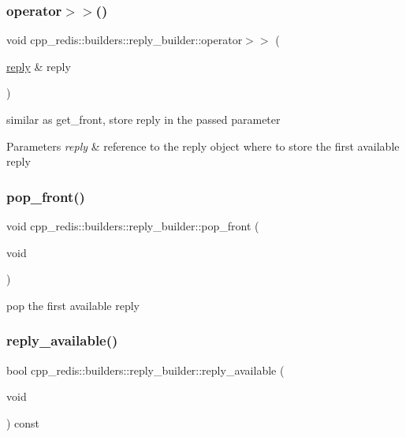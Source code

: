 \subsubsection{\texorpdfstring{operator$>$$>$()}{operator>>()}}
{\footnotesize\ttfamily void cpp\+\_\+redis\+::builders\+::reply\+\_\+builder\+::operator$>$$>$ (\begin{DoxyParamCaption}\item[{\mbox{\hyperlink{classcpp__redis_1_1reply}{reply}} \&}]{reply }\end{DoxyParamCaption})}

similar as get\+\_\+front, store reply in the passed parameter


\begin{DoxyParams}{Parameters}
{\em reply} & reference to the reply object where to store the first available reply \\
\hline
\end{DoxyParams}
\mbox{\label{classcpp__redis_1_1builders_1_1reply__builder_a0b5fb8dd4fc87c508e0a45647bc86b16}} 
\subsubsection{\texorpdfstring{pop\+\_\+front()}{pop\_front()}}
{\footnotesize\ttfamily void cpp\+\_\+redis\+::builders\+::reply\+\_\+builder\+::pop\+\_\+front (\begin{DoxyParamCaption}\item[{void}]{ }\end{DoxyParamCaption})}

pop the first available reply \mbox{\label{classcpp__redis_1_1builders_1_1reply__builder_af7d8e764ab591390cd1eae8801cd691c}} 
\subsubsection{\texorpdfstring{reply\+\_\+available()}{reply\_available()}}
{\footnotesize\ttfamily bool cpp\+\_\+redis\+::builders\+::reply\+\_\+builder\+::reply\+\_\+available (\begin{DoxyParamCaption}\item[{void}]{ }\end{DoxyParamCaption}) const}

